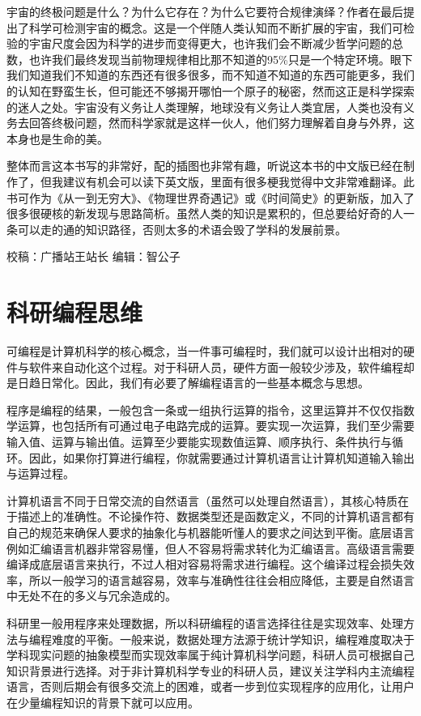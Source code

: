\documentclass[
]{book}
\begin{document}
宇宙的终极问题是什么？为什么它存在？为什么它要符合规律演绎？作者在最后提出了科学可检测宇宙的概念。这是一个伴随人类认知而不断扩展的宇宙，我们可检验的宇宙尺度会因为科学的进步而变得更大，也许我们会不断减少哲学问题的总数，也许我们最终发现当前物理规律相比那不知道的95\%只是一个特定环境。眼下我们知道我们不知道的东西还有很多很多，而不知道不知道的东西可能更多，我们的认知在野蛮生长，但可能还不够揭开哪怕一个原子的秘密，然而这正是科学探索的迷人之处。宇宙没有义务让人类理解，地球没有义务让人类宜居，人类也没有义务去回答终极问题，然而科学家就是这样一伙人，他们努力理解着自身与外界，这本身也是生命的美。

整体而言这本书写的非常好，配的插图也非常有趣，听说这本书的中文版已经在制作了，但我建议有机会可以读下英文版，里面有很多梗我觉得中文非常难翻译。此书可作为《从一到无穷大》、《物理世界奇遇记》或《时间简史》的更新版，加入了很多很硬核的新发现与思路简析。虽然人类的知识是累积的，但总要给好奇的人一条可以走的通的知识路径，否则太多的术语会毁了学科的发展前景。

校稿：广播站王站长
编辑：智公子

\hypertarget{ux79d1ux7814ux7f16ux7a0bux601dux7ef4}{%
\section{科研编程思维}\label{ux79d1ux7814ux7f16ux7a0bux601dux7ef4}}

可编程是计算机科学的核心概念，当一件事可编程时，我们就可以设计出相对的硬件与软件来自动化这个过程。对于科研人员，硬件方面一般较少涉及，软件编程却是日趋日常化。因此，我们有必要了解编程语言的一些基本概念与思想。

程序是编程的结果，一般包含一条或一组执行运算的指令，这里运算并不仅仅指数学运算，也包括所有可通过电子电路完成的运算。要实现一次运算，我们至少需要输入值、运算与输出值。运算至少要能实现数值运算、顺序执行、条件执行与循环。因此，如果你打算进行编程，你就需要通过计算机语言让计算机知道输入输出与运算过程。

计算机语言不同于日常交流的自然语言（虽然可以处理自然语言），其核心特质在于描述上的准确性。不论操作符、数据类型还是函数定义，不同的计算机语言都有自己的规范来确保人要求的抽象化与机器能听懂人的要求之间达到平衡。底层语言例如汇编语言机器非常容易懂，但人不容易将需求转化为汇编语言。高级语言需要编译成底层语言来执行，不过人相对容易将需求进行编程。这个编译过程会损失效率，所以一般学习的语言越容易，效率与准确性往往会相应降低，主要是自然语言中无处不在的多义与冗余造成的。

科研里一般用程序来处理数据，所以科研编程的语言选择往往是实现效率、处理方法与编程难度的平衡。一般来说，数据处理方法源于统计学知识，编程难度取决于学科现实问题的抽象模型而实现效率属于纯计算机科学问题，科研人员可根据自己知识背景进行选择。对于非计算机科学专业的科研人员，建议关注学科内主流编程语言，否则后期会有很多交流上的困难，或者一步到位实现程序的应用化，让用户在少量编程知识的背景下就可以应用。
\end{document}
